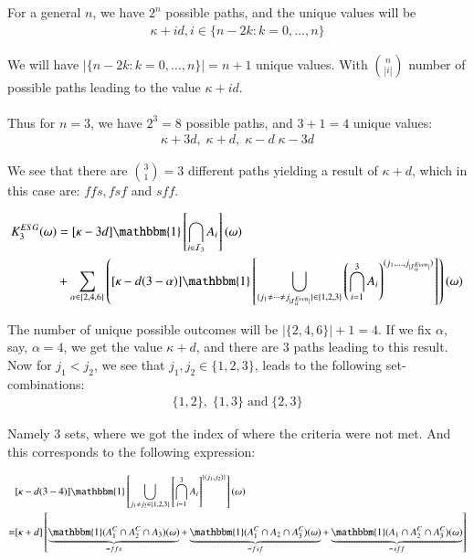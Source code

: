 For a general $n$, we have $2^{n}$ possible paths, and the unique values will be
\begin{align*}
\kappa + id, i\in \{n-2k: k=0, \dots, n\}    
\end{align*}

We will have $|\{n-2k: k=0, \dots, n\}| = n + 1$ unique values. With ${n \choose |i|}$ number of possible paths leading to the value $\kappa + id$. 
\\~\\
Thus for $n = 3$, we have $2^{3} = 8$ possible paths, and $3+1 =4$ unique values: 
\begin{align*}
\kappa +3d, \; \kappa +d,\; \kappa -d\; \kappa - 3d    
\end{align*} 

We see that there are ${3 \choose 1} = 3$ different paths yielding a result of $\kappa +d$, which in this case are: $ffs, fsf$ and $sff$. 

\newpage 

\begin{align*}
K_{3}^{ESG}(\omega) &= 
[\kappa -3d]\mathbbm{1}\left[
\bigcap_{i\in \mathcal{I}_{3}}A_{i}
\right](\omega) \\ 
&+ 
\sum_{\alpha \in \{2,4,6\}}
\left(
[\kappa -d(3-\alpha)]\mathbbm{1}\left[
\bigcup_{\{
j_{1}\neq \dots \neq j_{|\mathcal{I}_{\alpha}^{Even}|}
\}
\in \{1,2,3\}
}\left(
\bigcap_{i =1}^{3}A_{i}
\right)^{
(j_{1}, \dots , j_{|\mathcal{I}_{\alpha}^{Even}|})
}
\right]
\right)(\omega) 
\end{align*}

The number of unique possible outcomes will be $|\{2,4,6\}| + 1 = 4$. If we fix $\alpha$, say, $\alpha = 4$, we get the value $\kappa +d$, and there are $3$ paths leading to this result. Now for $j_{1} < j_{2}$, we see that $j_{1}, j_{2} \in \{1,2,3\}$, leads to the following set-combinations: 
\begin{align*}
\{1,2\}, \; \{1,3\}\;\text{and}\; \{2,3\}    
\end{align*}

Namely $3$ sets, where we got the index of where the criteria were not met. And this corresponds to the following expression: 

\begin{align*}
 &[\kappa - d(3-4)]\mathbbm{1}\left[
\bigcup_{j_{1}\neq j_{2}\in \{1,2,3\}}
\left[\bigcap_{i=1}^{3}A_{i}\right]^{\{(j_{1}, j_{2})\}}
\right](\omega) \\
= &[\kappa + d]\left[
\underbrace{
\mathbbm{1}(A_{1}^{C}\cap A_{2}^{C}\cap A_{3})(\omega)
}_{=ffs}
+ 
\underbrace{
\mathbbm{1}(A_{1}^{C}\cap A_{2}\cap A_{3}^{C})(\omega)
}_{=fsf} + 
\underbrace{
\mathbbm{1}(A_{1}\cap A_{2}^{C}\cap A_{3}^{C})(\omega)
}_{= sff}
\right]   
\end{align*}


